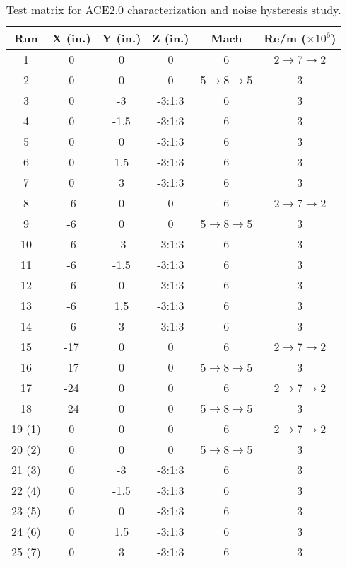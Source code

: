 \begin{table}[ht]
    \centering
    \label{tab:ace2-survey}
    \begin{tabular}{|c|c|c|c|c|c|}
        \hline
        \textbf{Run} & \textbf{X (in.)} & \textbf{Y (in.)} & \textbf{Z (in.)} & \textbf{Mach} & \textbf{Re/m ($\times10^6$)} \\ \hline
        1 & 0 & 0 & 0 & 6 & 2$\to$7$\to$2 \\ \hline
        2 & 0 & 0 & 0 & 5$\to$8$\to$5 & 3 \\ \hline
        3 & 0 & -3 & -3:1:3 & 6 & 3 \\ \hline
        4 & 0 & -1.5 & -3:1:3 & 6 & 3 \\ \hline
        5 & 0 & 0 & -3:1:3 & 6 & 3 \\ \hline
        6 & 0 & 1.5 & -3:1:3 & 6 & 3 \\ \hline
        7 & 0 & 3 & -3:1:3 & 6 & 3 \\ \hline
        8 & -6 & 0 & 0 & 6 & 2$\to$7$\to$2 \\ \hline
        9 & -6 & 0 & 0 & 5$\to$8$\to$5 & 3 \\ \hline
        10 & -6 & -3 & -3:1:3 & 6 & 3 \\ \hline
        11 & -6 & -1.5 & -3:1:3 & 6 & 3 \\ \hline
        12 & -6 & 0 & -3:1:3 & 6 & 3 \\ \hline
        13 & -6 & 1.5 & -3:1:3 & 6 & 3 \\ \hline
        14 & -6 & 3 & -3:1:3 & 6 & 3 \\ \hline
        15 & -17 & 0 & 0 & 6 & 2$\to$7$\to$2 \\ \hline
        16 & -17 & 0 & 0 & 5$\to$8$\to$5 & 3 \\ \hline
        17 & -24 & 0 & 0 & 6 & 2$\to$7$\to$2 \\ \hline
        18 & -24 & 0 & 0 & 5$\to$8$\to$5 & 3 \\ \hline
        19 (1) & 0 & 0 & 0 & 6 & 2$\to$7$\to$2 \\ \hline
        20 (2)& 0 & 0 & 0 & 5$\to$8$\to$5 & 3 \\ \hline
        21 (3) & 0 & -3 & -3:1:3 & 6 & 3 \\ \hline
        22 (4) & 0 & -1.5 & -3:1:3 & 6 & 3 \\ \hline
        23 (5) & 0 & 0 & -3:1:3 & 6 & 3 \\ \hline
        24 (6) & 0 & 1.5 & -3:1:3 & 6 & 3 \\ \hline
        25 (7) & 0 & 3 & -3:1:3 & 6 & 3 \\ \hline
    \end{tabular}
    \caption{Test matrix for ACE2.0 characterization and noise hysteresis study.}
\end{table}


